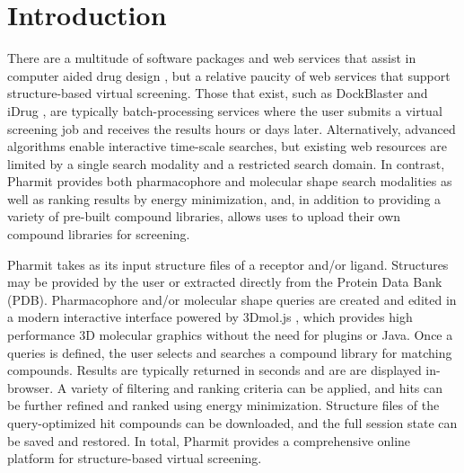 \section{Introduction}

There are a multitude of software packages and web services that assist in computer aided drug design \cite{Villoutreix_2013}, but a relative paucity of web services that support structure-based virtual screening.  Those that exist, such as DockBlaster \cite{Irwin_2009} and iDrug \cite{Wang_2014}, are typically batch-processing services where the user submits a virtual screening job and receives the results hours or days later.  Alternatively, advanced algorithms enable interactive time-scale searches, but existing web resources \cite{Koes_2012,Koes_2012z} are limited by a single search modality and a restricted search domain.  In contrast, Pharmit provides both pharmacophore and molecular shape search modalities as well as ranking results by energy minimization, and, in addition to providing a variety of pre-built compound libraries, allows uses to upload their own compound libraries for screening. 

Pharmit takes as its input structure files of a receptor and/or ligand. Structures may be provided by the user or extracted directly from the Protein Data Bank (PDB). 
Pharmacophore and/or molecular shape queries are created and edited in a modern interactive interface powered by 3Dmol.js \cite{Rego_2014}, which provides high performance 3D molecular graphics without the need for plugins or Java. Once a queries is defined, the user selects and searches a compound library for matching compounds.  Results are typically returned in seconds and are are displayed in-browser.  A variety of filtering and ranking criteria can be applied, and hits can be further refined and ranked using energy minimization. Structure files of the query-optimized hit compounds can be downloaded, and the full session state can be saved and restored.  In total, Pharmit provides a comprehensive online platform for structure-based virtual screening.





